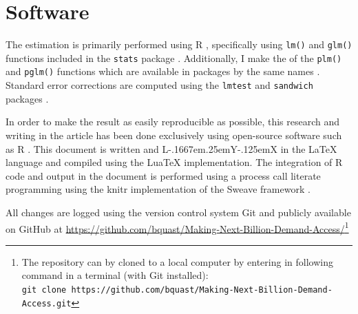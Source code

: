 \documentclass[a4paper,british]{article}\usepackage[]{graphicx}\usepackage[]{color}
\makeatletter
\providecommand{\LyX}{\texorpdfstring%
  {L\kern-.1667em\lower.25em\hbox{Y}\kern-.125emX\@}
  {LyX}}
\newcommand{\code}[1]{\texttt{#1}}
\makeatother
\begin{document}
\newpage{}

\section{Software}

The estimation is primarily performed using R \citep*{R}, specifically
using \code{lm()} and \code{glm()} functions included in the \code{stats}
package \citep{venables2013Splus}. Additionally, I make the of the
\code{plm()} and \code{pglm()} functions which are available in
packages by the same names \citep{croissant2008plm,croissant2013pglm}.
Standard error corrections are computed using the \code{lmtest} and
\code{sandwich} packages \citet{zeileis2002lmtest,zeileis2004sandwichI,zeileis2006sandwichII}.

In order to make the result as easily reproducible as possible, this
research and writing in the article has been done exclusively using
open-source software such as R \citep*{R}. This document is written
and \LyX{} \citep{lyx} in the \LaTeX{}\citep{lamport1985latex}
language and compiled using the LuaTeX implementation\citep{luatex}.
The integration of R code and output in the document is performed
using a process call literate programming \citet{knuth1984literate}
using the knitr implementation \citet{xie2015knitr} of the Sweave
framework \citep{leisch2002sweave}.

All changes are logged using the version control system Git \citep{git}
and publicly available on GitHub at \href{https://github.com/bquast/Making-Next-Billion-Demand-Access/}{https://github.com/bquast/Making-Next-Billion-Demand-Access/}\footnote{The repository can by cloned to a local computer by entering in following
command in a terminal (with Git installed):\\
\code{git clone https://github.com/bquast/Making-Next-Billion-Demand-Access.git}}
\end{document}
